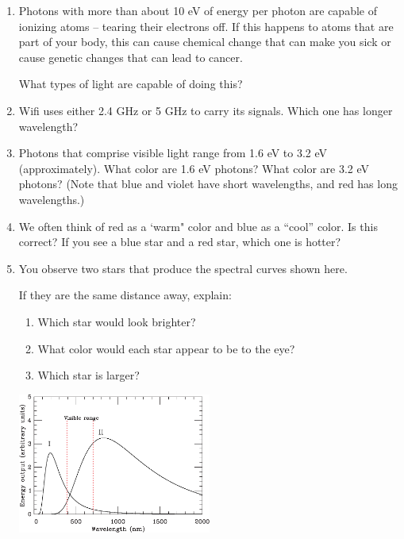 \documentclass[12pt]{article}
\begin{document}
\begin{enumerate}
	\item Photons with more than about 10 eV of energy per photon are capable of ionizing atoms -- tearing their electrons off. If this happens to atoms that are part of your body, this can cause chemical change that can make you sick or cause genetic changes that can lead to cancer.
	
	What types of light are capable of doing this?
	
	\item Wifi uses either 2.4 GHz or 5 GHz to carry its signals. Which one has longer wavelength?
	
	\item Photons that comprise visible light range from 1.6 eV to 3.2 eV (approximately). What color are 1.6 eV photons? What color are 3.2 eV photons? (Note that blue and violet have short wavelengths, and red has long wavelengths.)
	
	\item We often think of red as a `warm" color and blue as a ``cool'' color. Is this correct? If you see a blue star and a red star, which one is hotter?
	
	\item You observe two stars that produce the spectral curves shown here.
	
	\begin{minipage}{0.5\textwidth}If they are the same distance away, explain:
		
	\begin{enumerate}
	\item Which star would look brighter?
	\item What color would each star appear to be to the eye?
	\item Which star is larger?
	\end{enumerate}
	\end{minipage}
\hspace{0.05\textwidth}
	\begin{minipage}{0.4\textwidth}
	\includegraphics[width=2.5in]{twostars-crop.pdf}
	\end{minipage}


\end{enumerate}
\end{document}
